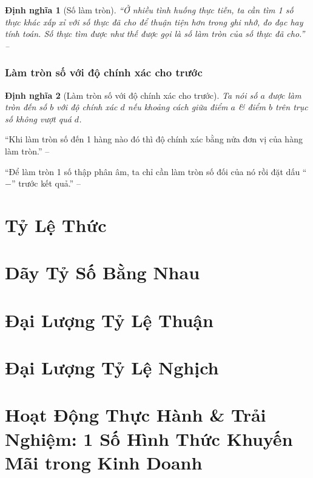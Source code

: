 \documentclass[oneside]{book}
\numberwithin{equation}{section}
\newtheorem{dinhnghia}{Định nghĩa}[section]
\begin{document}
\begin{dinhnghia}[Số làm tròn]
	``Ở nhiều tình huống thực tiễn, ta cần tìm 1 số thực khác xấp xỉ với số thực đã cho để thuận tiện hơn trong ghi nhớ, đo đạc hay tính toán. Số thực tìm được như thế được gọi là \emph{số làm tròn} của số thực đã cho.'' -- \cite[p. 48]{SGK_Toan_7_Canh_Dieu_tap_1}
\end{dinhnghia}

\subsubsection{Làm tròn số với độ chính xác cho trước}

\begin{dinhnghia}[Làm tròn số với độ chính xác cho trước]
	Ta nói số $a$ được làm tròn đến số $b$ với độ chính xác $d$ nếu khoảng cách giữa điểm $a$ \& điểm $b$ trên trục số không vượt quá $d$.
\end{dinhnghia}
``Khi làm tròn số đến 1 hàng nào đó thì độ chính xác bằng nửa đơn vị của hàng làm tròn.'' -- \cite[p. 49]{SGK_Toan_7_Canh_Dieu_tap_1}

``Để làm tròn 1 số thập phân âm, ta chỉ cần làm tròn số đối của nó rồi đặt dấu ``$-$'' trước kết quả.'' -- \cite[p. 50]{SGK_Toan_7_Canh_Dieu_tap_1}

\section{Tỷ Lệ Thức}

\section{Dãy Tỷ Số Bằng Nhau}

\section{Đại Lượng Tỷ Lệ Thuận}

\section{Đại Lượng Tỷ Lệ Nghịch}

\section{Hoạt Động Thực Hành \& Trải Nghiệm: 1 Số Hình Thức Khuyến Mãi trong Kinh Doanh}

\end{document}
